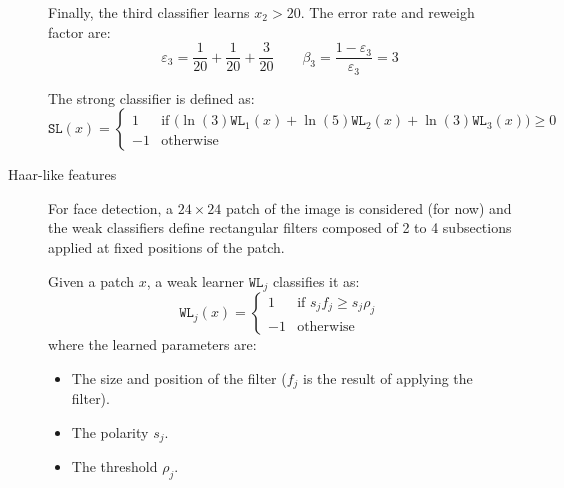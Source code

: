 \begin{description}
\begin{example}
            Finally, the third classifier learns $x_2 > 20$. The error rate and reweigh factor are:
            \[ \varepsilon_3 = \frac{1}{20} + \frac{1}{20} + \frac{3}{20} \qquad
            \beta_3 = \frac{1 - \varepsilon_3}{\varepsilon_3} = 3 \]

            The strong classifier is defined as:
            \[ \texttt{SL}(x) = \begin{cases}
                1 & \text{if $\big( \ln(3)\texttt{WL}_1(x) + \ln(5)\texttt{WL}_2(x) + \ln(3)\texttt{WL}_3(x) \big) \geq 0$} \\
                -1 & \text{otherwise}
            \end{cases} \]
        \end{example}

    \item[Haar-like features] 
        For face detection, a $24 \times 24$ patch of the image is considered (for now) and the weak classifiers define rectangular filters composed of 2 to 4 subsections applied at fixed positions of the patch.

        Given a patch $x$, a weak learner $\texttt{WL}_j$ classifies it as:
        \[
            \texttt{WL}_j(x) = \begin{cases}
                1 & \text{if $s_j f_j \geq s_j \rho_j$} \\
                -1 & \text{otherwise}
            \end{cases}
        \]
        where the learned parameters are:
        \begin{itemize}
            \item The size and position of the filter ($f_j$ is the result of applying the filter).
            \item The polarity $s_j$.
            \item The threshold $\rho_j$.
        \end{itemize}


\end{description}
